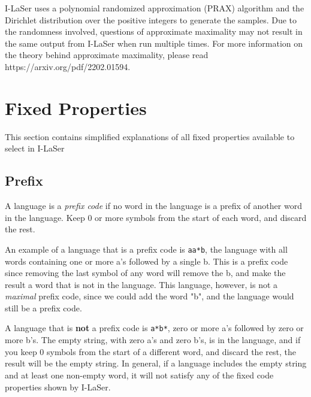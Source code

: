 \documentclass{article}
\begin{document}
\par I-LaSer uses a polynomial randomized approximation (PRAX) algorithm and the Dirichlet distribution over the positive integers to generate the samples. Due to the randomness involved, questions of approximate maximality may not result in the same output from I-LaSer when run multiple times. For more information on the theory behind approximate maximality, please read https://arxiv.org/pdf/2202.01594. 


\section{Fixed Properties}

This section contains simplified explanations of all fixed properties available to select in I-LaSer

\subsection{Prefix}
A language is a \textit{prefix code} if no word in the language is a prefix of another word in the language. Keep 0 or more symbols from the start of each word, and discard the rest. 

\par An example of a language that is a prefix code is \verb-aa*b-, the language with all words containing one or more a's followed by a single b. This is a prefix code since removing the last symbol of any word will remove the b, and make the result a word that is not in the language. This language, however, is not a \textit{maximal} prefix code, since we could add the word "b", and the language would still be a prefix code. 

\par A language that is \textbf{not} a prefix code is \verb-a*b*-, zero or more a's followed by zero or more b's. The empty string, with zero a's and zero b's, is in the language, and if you keep 0 symbols from the start of a different word, and discard the rest, the result will be the empty string. In general, if a language includes the empty string and at least one non-empty word, it will not satisfy any of the fixed code properties shown by I-LaSer. 
\end{document}
